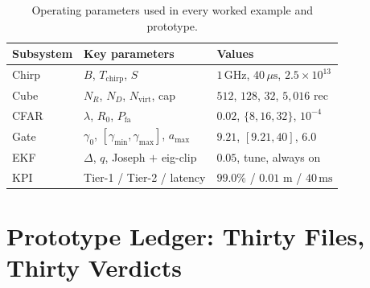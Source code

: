 \documentclass[11pt,oneside]{book}
\begin{document}
\begin{table}[htbp]
\centering\small
\begin{tabularx}{\linewidth}{@{}llX@{}}
\toprule
Subsystem & Key parameters & Values \\
\midrule
Chirp & $B$, $T_{\mathrm{chirp}}$, $S$ & $1\,\mathrm{GHz}$, $40\,\mu\mathrm{s}$, $2.5\times10^{13}$ \\
Cube & $N_R$, $N_D$, $N_{\mathrm{virt}}$, cap & $512$, $128$, $32$, $5{,}016$ rec \\
CFAR & $\lambda$, $R_0$, $P_{\mathrm{fa}}$ & $0.02$, $\{8,16,32\}$, $10^{-4}$ \\
Gate & $\gamma_0$, $[\gamma_{\min},\gamma_{\max}]$, $a_{\max}$ & $9.21$, $[9.21,40]$, $6.0$ \\
EKF & $\Delta$, $q$, Joseph $+$ eig-clip & $0.05$, tune, always on \\
KPI & Tier-1 / Tier-2 / latency & $99.0\%$ / $0.01$ m / $40\,\mathrm{ms}$ \\
\bottomrule
\end{tabularx}
\caption{Operating parameters used in every worked example and prototype.}
\label{tab:params}
\end{table}

\chapter{Prototype Ledger: Thirty Files, Thirty Verdicts}
\label{ch:ledger}
\end{document}
